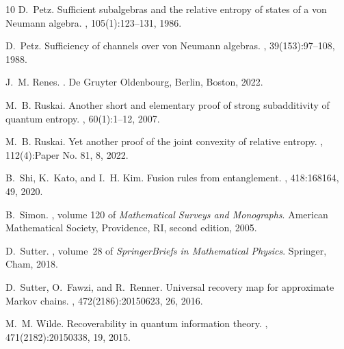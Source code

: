 \documentclass{article}
\numberwithin{equation}{section}
\begin{document}
\begin{thebibliography}{10}
D.~Petz.
\newblock Sufficient subalgebras and the relative entropy of states of a von
  {N}eumann algebra.
, 105(1):123--131, 1986.

D.~Petz.
\newblock Sufficiency of channels over von {N}eumann algebras.
, 39(153):97--108, 1988.

J.~M. Renes.
.
\newblock De Gruyter Oldenbourg, Berlin, Boston, 2022.

M.~B. Ruskai.
\newblock Another short and elementary proof of strong subadditivity of quantum
  entropy.
, 60(1):1--12, 2007.

M.~B. Ruskai.
\newblock Yet another proof of the joint convexity of relative entropy.
, 112(4):Paper No. 81, 8, 2022.

B.~Shi, K.~Kato, and I.~H. Kim.
\newblock Fusion rules from entanglement.
, 418:168164, 49, 2020.

B.~Simon.
, volume 120 of {\em
  Mathematical Surveys and Monographs}.
\newblock American Mathematical Society, Providence, RI, second edition, 2005.

D.~Sutter.
, volume~28 of {\em
  SpringerBriefs in Mathematical Physics}.
\newblock Springer, Cham, 2018.

D.~Sutter, O.~Fawzi, and R.~Renner.
\newblock Universal recovery map for approximate {M}arkov chains.
, 472(2186):20150623, 26, 2016.

M.~M. Wilde.
\newblock Recoverability in quantum information theory.
, 471(2182):20150338, 19, 2015.

\end{thebibliography}
\end{document}
